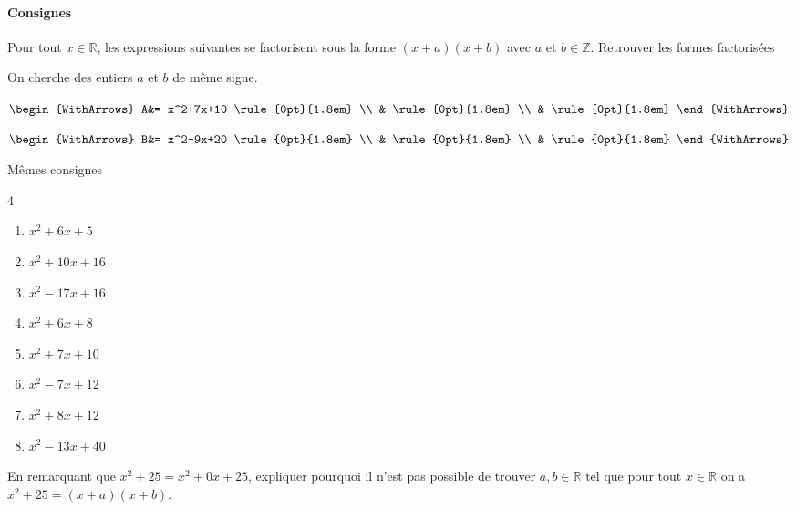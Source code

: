 \paragraph{Consignes} Pour tout  $x\in\mathbb{R}$, les expressions suivantes se factorisent sous la forme $(x+a)(x+b)$  avec $a$ et $b\in\mathbb{Z}$. Retrouver les formes factorisées 
\begin{example}[Cas p>0]  On cherche des entiers $a$ et $b$ de même signe.
	
\noindent\parbox{0.45\linewidth}{	
		$\begin{WithArrows}
			A&= x^2+7x+10 \rule{0pt}{1.8em} \\ 
			& \rule{0pt}{1.8em}  \\  
			&  \rule{0pt}{1.8em}     
		\end{WithArrows}$
	}   \hfill\parbox{0.48\linewidth}{	
		$\begin{WithArrows}
			B&=  x^2-9x+20  \rule{0pt}{1.8em} \\ 
			& \rule{0pt}{1.8em}  \\  
			&  \rule{0pt}{1.8em}      
		\end{WithArrows}$
	}  
\end{example}
\begin{exercise}[À vous]\label{chapitre03:factorisation:essaierreur01}\label{chapitre03:exercice:factorisationparessaierreur:niveau01}  Mêmes consignes
	\begin{multicols}{4} 
		\begin{enumerate}[label={$\Alph*(x)=$\rule{0pt}{1.8em}}, leftmargin=*] 
			\item $x^2+6x+5$
			\item $x^2+10x+16$
			\item $x^2-17x+16$
			\item $x^2+6x+8$
			\item $x^2+7x+10$
			\item $x^2-7x+12$
			\item $x^2+8x+12$
			\item $x^2-13x+40$
		\end{enumerate}
	\end{multicols}
\end{exercise}
\begin{exercise}\hfill 
	
En remarquant que $x^2+25=x^2+0x+25$, expliquer pourquoi il n'est pas possible de trouver $a, b\in\mathbb{R}$ tel que \og pour tout $x\in\mathbb{R}$ on a $x^2+25=(x+a)(x+b)$\fg{}.
\end{exercise}
